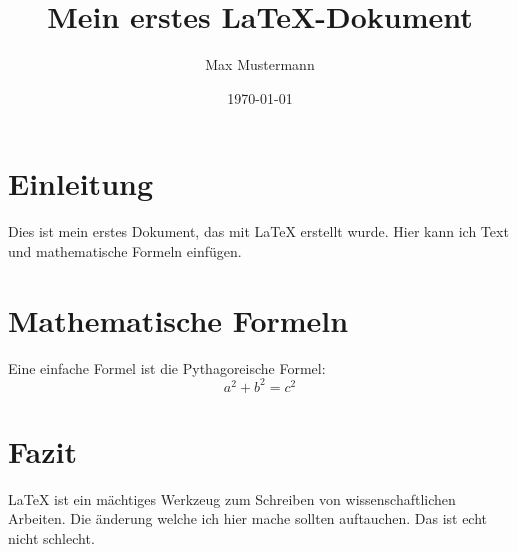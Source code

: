 \documentclass{article}
\title{Mein erstes LaTeX-Dokument}
\author{Max Mustermann}
\date{\today}
\begin{document}
\maketitle

\section{Einleitung}
Dies ist mein erstes Dokument, das mit LaTeX erstellt wurde. Hier kann ich Text und mathematische Formeln einfügen.

\section{Mathematische Formeln}
Eine einfache Formel ist die Pythagoreische Formel:
\begin{equation}
a^2 + b^2 = c^2
\end{equation}

\section{Fazit}
LaTeX ist ein mächtiges Werkzeug zum Schreiben von wissenschaftlichen Arbeiten.
Die änderung welche ich hier mache sollten auftauchen. Das ist echt nicht schlecht.
\end{document}
